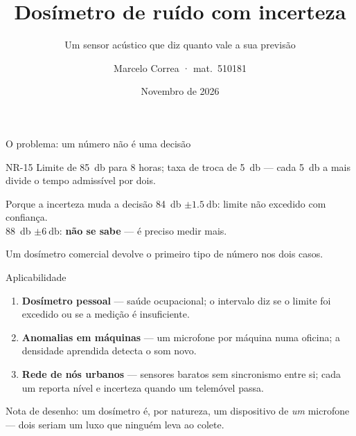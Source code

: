\documentclass[aspectratio=169,10pt]{beamer}
\title[Dosímetro com incerteza]{Dosímetro de ruído com incerteza}
\subtitle{Um sensor acústico que diz quanto vale a sua previsão}
\author{Marcelo Correa · mat.\ 510181}
\institute[UFC]{Universidade Federal do Ceará · CK0475 Aprendizagem de Máquina Probabilística}
\date{Novembro de 2026}
\begin{document}
\begin{frame}
  \titlepage
\end{frame}

\begin{frame}{O problema: um número não é uma decisão}
  \begin{block}{NR-15}
    Limite de \SI{85}{\decibel} para 8 horas; taxa de troca de \SI{5}{\decibel} — cada
    \SI{5}{\decibel} a mais divide o tempo admissível por dois.
  \end{block}
  \vspace{0.3cm}
  \begin{alertblock}{Porque a incerteza muda a decisão}
    \SI{84}{\decibel} $\pm \SI{1.5}{\decibel}$: limite não excedido com confiança.\\
    \SI{88}{\decibel} $\pm \SI{6}{\decibel}$: \textbf{não se sabe} — é preciso medir mais.
  \end{alertblock}
  \vspace{0.2cm}
  Um dosímetro comercial devolve o primeiro tipo de número nos dois casos.
\end{frame}

\begin{frame}{Aplicabilidade}
  \begin{enumerate}
    \item \textbf{Dosímetro pessoal} — saúde ocupacional; o intervalo diz se o limite foi
          excedido ou se a medição é insuficiente.
    \item \textbf{Anomalias em máquinas} — um microfone por máquina numa oficina; a densidade
          aprendida detecta o som novo.
    \item \textbf{Rede de nós urbanos} — sensores baratos sem sincronismo entre si; cada um
          reporta nível e incerteza quando um telemóvel passa.
  \end{enumerate}
  \vspace{0.3cm}
  \footnotesize Nota de desenho: um dosímetro é, por natureza, um dispositivo de \emph{um}
  microfone — dois seriam um luxo que ninguém leva ao colete.
\end{frame}
\end{document}
